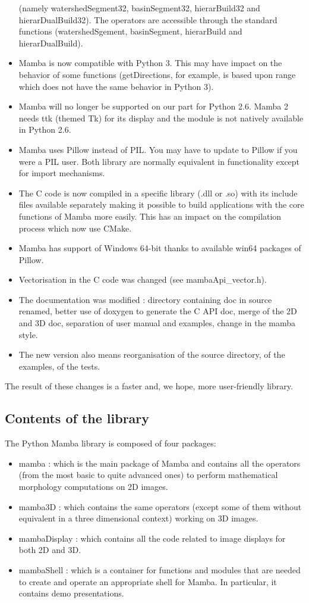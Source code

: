 \documentclass[a4paper,10pt,oneside]{article}
\begin{document}
\begin{itemize}
(namely watershedSegment32, basinSegment32, hierarBuild32 and hierarDualBuild32).
The operators are accessible through the standard functions (watershedSgement,
basinSegment, hierarBuild and hierarDualBuild).
\item Mamba is now compatible with Python 3. This may have impact on the
behavior of some functions (getDirections, for example, is based upon range
which does not have the same behavior in Python 3).
\item Mamba will no longer be supported on our part for Python 2.6. Mamba 2
needs ttk (themed Tk) for its display and the module is not natively available
in Python 2.6.
\item Mamba uses Pillow instead of PIL. You may have to update to Pillow if
you were a PIL user. Both library are normally equivalent in functionality
except for import mechanisms.
\item The C code is now compiled in a specific library (.dll or .so) with
its include files available separately making it possible to build applications
with the core functions of Mamba more easily. This has an impact on the
compilation process which now use CMake.
\item Mamba has support of Windows 64-bit thanks to available win64 packages
of Pillow.
\item Vectorisation in the C code was changed (see mambaApi\_vector.h).
\item The documentation was modified : directory containing doc in source renamed,
better use of doxygen to generate the C API doc, merge of the 2D and 3D doc,
separation of user manual and examples, change in the mamba style.
\item The new version also means reorganisation of the source directory, of the
examples, of the tests.
\end{itemize}

The result of these changes is a faster and, we hope, more user-friendly
library.

\subsection{Contents of the library}

The Python Mamba library is composed of four packages:
\begin{itemize}
\item mamba : which is the main package of Mamba and contains all the operators
(from the most basic to quite advanced ones) to perform mathematical morphology
computations on 2D images.
\item mamba3D : which contains the same operators (except some of them without
equivalent in a three dimensional context) working on 3D images.
\item mambaDisplay : which contains all the code related to image displays for
both 2D and 3D.
\item mambaShell : which is a container for functions and modules that are
needed to create and operate an appropriate shell for Mamba. In particular, it
contains demo presentations.
\end{itemize}
\end{document}
